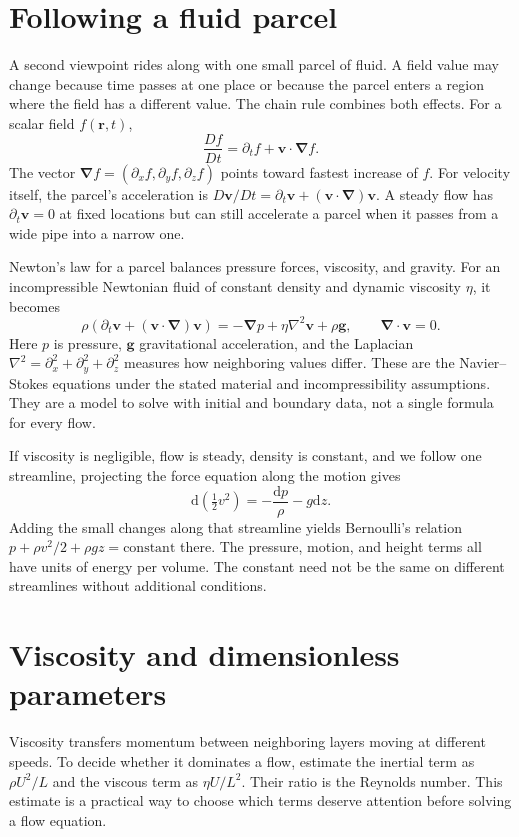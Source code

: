 \documentclass[11pt,oneside]{book}
\newcommand{\dd}{\mathrm{d}}
\newcommand{\vect}[1]{\boldsymbol{#1}}
\newcommand{\grad}{\boldsymbol{\nabla}}
\newcommand{\lap}{\nabla^2}
\theoremstyle{reviewstyle}
\begin{document}
\section{Following a fluid parcel}
A second viewpoint rides along with one small parcel of fluid. A field value may change because time passes at one place or because the parcel enters a region where the field has a different value. The chain rule combines both effects. For a scalar field $f(\vect r,t)$,
\begin{equation}
\frac{Df}{Dt}=\partial_t f+\vect v\cdot\grad f.
\end{equation}
The vector $\grad f=(\partial_xf,\partial_yf,\partial_zf)$ points toward fastest increase of $f$. For velocity itself, the parcel's acceleration is $D\vect v/Dt=\partial_t\vect v+(\vect v\cdot\grad)\vect v$. A steady flow has $\partial_t\vect v=0$ at fixed locations but can still accelerate a parcel when it passes from a wide pipe into a narrow one.

Newton's law for a parcel balances pressure forces, viscosity, and gravity. For an incompressible Newtonian fluid of constant density and dynamic viscosity $\eta$, it becomes
\begin{equation}
\rho\left(\partial_t\vect v+(\vect v\cdot\grad)\vect v\right)
=-\grad p+\eta\lap\vect v+\rho\vect g,
\qquad \grad\cdot\vect v=0.
\end{equation}
Here $p$ is pressure, $\vect g$ gravitational acceleration, and the Laplacian $\lap=\partial_x^2+\partial_y^2+\partial_z^2$ measures how neighboring values differ. These are the Navier--Stokes equations under the stated material and incompressibility assumptions. They are a model to solve with initial and boundary data, not a single formula for every flow.

If viscosity is negligible, flow is steady, density is constant, and we follow one streamline, projecting the force equation along the motion gives
\begin{equation}
\dd\left(\tfrac12v^2\right)=-\frac{\dd p}{\rho}-g\dd z.
\end{equation}
Adding the small changes along that streamline yields Bernoulli's relation $p+\rho v^2/2+\rho gz=\text{constant}$ there. The pressure, motion, and height terms all have units of energy per volume. The constant need not be the same on different streamlines without additional conditions.

\section{Viscosity and dimensionless parameters}
Viscosity transfers momentum between neighboring layers moving at different speeds. To decide whether it dominates a flow, estimate the inertial term as $\rho U^2/L$ and the viscous term as $\eta U/L^2$. Their ratio is the Reynolds number. This estimate is a practical way to choose which terms deserve attention before solving a flow equation.
\end{document}
